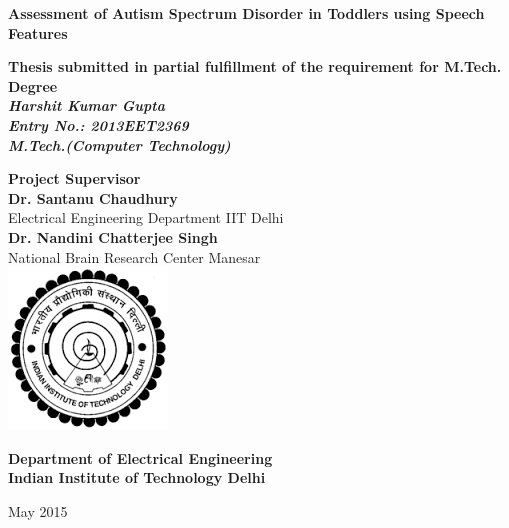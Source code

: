 \documentclass[11pt]{report}
\begin{document}
\hypersetup{colorlinks=true,linkcolor=black,urlcolor=black}


\begin{titlepage}
\thispagestyle{empty}
\vspace*{0.7cm}
{\centering     
\large
{\Large\bf Assessment of Autism Spectrum Disorder in Toddlers using Speech Features }\\
}
\begin{center}

\bf{Thesis submitted in partial fulfillment of the requirement for M.Tech. Degree}\\
\vspace{0.25cm}
\vspace{0.1cm}
\vspace{1cm}
\it
\vspace{.5cm}
\rm
{\bfseries {Harshit Kumar Gupta}}\\
{\bfseries {Entry No.: 2013EET2369}}\\
{\bfseries {M.Tech.(Computer Technology)}}\\
\vspace{1cm}

{\bfseries {Project Supervisor}}\\
\vspace{0.25cm}
{\bfseries Dr. Santanu Chaudhury}\\
Electrical Engineering Department IIT Delhi\\
\vspace{0.25cm}
{\bfseries Dr. Nandini Chatterjee Singh}\\
National Brain Research Center Manesar\\
\vspace{3cm}
 \includegraphics[scale=1,keepaspectratio=true]{./images/IITD.png}
\vspace{1cm}

{\bfseries Department of Electrical Engineering} \\ 
\vspace{0.5cm}
{\bf \LARGE Indian Institute of Technology Delhi}\\ 
\end{center}
\begin{center}
 May 2015
\end{center}
\pagebreak 
\end{titlepage}
\end{document}
